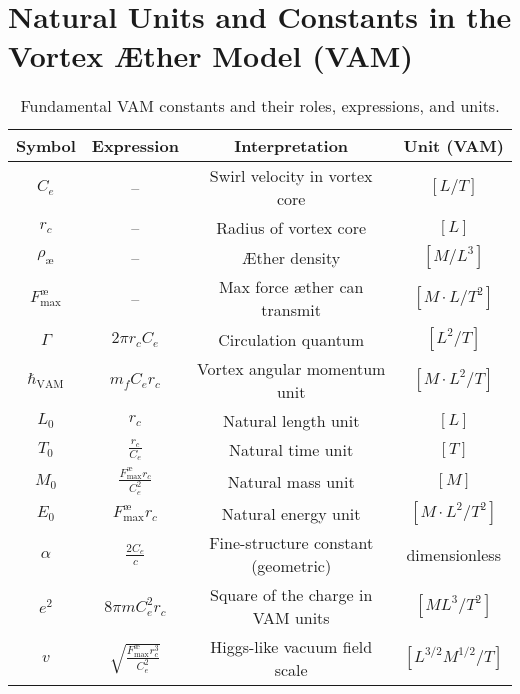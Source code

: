\section{Natural Units and Constants in the Vortex Æther Model (VAM)}
\renewcommand{\arraystretch}{1.3}
\begin{table}[H]
    \centering
    \footnotesize
    \caption{Fundamental VAM constants and their roles, expressions, and units.}
    \begin{tabular}{|c|c|c|c|}
        \hline
        \textbf{Symbol} & \textbf{Expression} & \textbf{Interpretation} & \textbf{Unit (VAM)} \\
        \hline
        $C_e$ & -- & Swirl velocity in vortex core & $[L/T]$ \\
        \hline
        $r_c$ & -- & Radius of vortex core & $[L]$ \\
        \hline
        $\rho_\text{\ae}$ & -- & Æther density & $[M/L^3]$ \\
        \hline
        $F^{\text{\ae}}_{\text{max}}$ & -- & Max force æther can transmit & $[M \cdot L / T^2]$ \\
        \hline
        $\Gamma$ & $2\pi r_c C_e$ & Circulation quantum & $[L^2 / T]$ \\
        \hline
        $\hbar_\text{VAM}$ & $m_f C_e r_c$ & Vortex angular momentum unit & $[M \cdot L^2 / T]$ \\
        \hline
        $L_0$ & $r_c$ & Natural length unit & $[L]$ \\
        \hline
        $T_0$ & $\frac{r_c}{C_e}$ & Natural time unit & $[T]$ \\
        \hline
        $M_0$ & $\frac{F^{\text{\ae}}_{\text{max}} r_c}{C_e^2}$ & Natural mass unit & $[M]$ \\
        \hline
        $E_0$ & $F^{\text{\ae}}_{\text{max}} r_c$ & Natural energy unit & $[M \cdot L^2 / T^2]$ \\
        \hline
        $\alpha$ & $\frac{2 C_e}{c}$ & Fine-structure constant (geometric) & dimensionless \\
        \hline
        $e^2$ & $8\pi m C_e^2 r_c$ & Square of the charge in VAM units & $[M L^3 / T^2]$ \\
        \hline
        $v$ & $\sqrt{\frac{F^{\text{\ae}}_{\text{max}} r_c^3}{C_e^2}}$ & Higgs-like vacuum field scale & $[L^{3/2} M^{1/2} / T]$ \\
        \hline
    \end{tabular}
    \label{tab:VAM_constants_summary}
\end{table}
